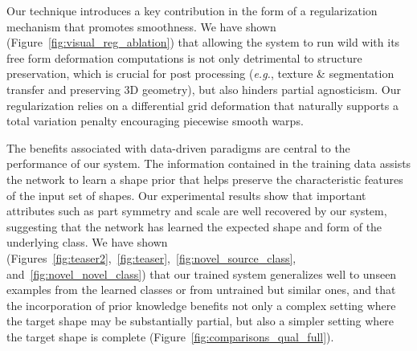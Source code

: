 \documentclass[acmtog,timestamp]{acmart}%
\begin{document}
Our technique introduces a key contribution in the form of a regularization mechanism that promotes smoothness. We have shown (Figure~\ref{fig:visual_reg_ablation}) that allowing the system to run wild with its free form deformation computations is not only detrimental to structure preservation, which is crucial for post processing (\emph{e.g.}, texture \& segmentation transfer and preserving 3D geometry), but also hinders partial agnosticism. Our regularization relies on a differential grid deformation that naturally supports a total variation penalty encouraging piecewise smooth warps.

The benefits associated with data-driven paradigms are central to the performance of our system. The information contained in the training data assists the network to learn a shape prior that helps preserve the characteristic features of the input set of shapes. Our experimental results show that important attributes  such as part symmetry and scale are well recovered by our system, suggesting that the network has learned the expected shape and form of the underlying class. 
We have shown (Figures~\ref{fig:teaser2},~\ref{fig:teaser},~\ref{fig:novel_source_class}, and~\ref{fig:novel_novel_class})
that our trained system generalizes well to unseen examples from the learned classes or from untrained but similar ones, and that the incorporation of prior knowledge benefits not only a complex setting where the target shape may be substantially partial, but also a simpler setting where the target shape is complete (Figure~\ref{fig:comparisons_qual_full}).
\end{document}
